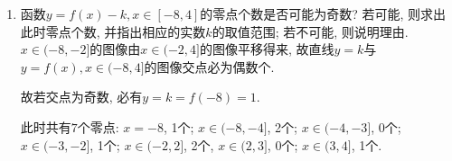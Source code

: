 \documentclass[8pt]{article}
\begin{document}
\begin{enumerate}[label=\arabic*.]
\begin{enumerate}[label=(\arabic*)]
				~\\

				\item 函数$y=f(x)-k, x\in[-8, 4]$的零点个数是否可能为奇数? 若可能, 则求出此时零点个数, 并指出相应的实数$k$的取值范围; 若不可能, 则说明理由.
					~\\

					$x \in (-8, -2]$的图像由$x\in (-2, 4]$的图像平移得来, 故直线$y=k$与$y=f(x), x\in(-8, 4]$的图像交点必为偶数个.

					故若交点为奇数, 必有$y=k=f(-8)=1$.

					此时共有$7$个零点: $x=-8$, 1个; $x\in (-8, -4]$, 2个; $x\in(-4, -3]$, 0个; $x\in(-3, -2]$, 1个; $x\in (-2, 2]$, 2个, $x\in (2, 3]$, 0个; $x\in (3, 4]$, 1个.

			\end{enumerate}

	\end{enumerate}
\end{document}
